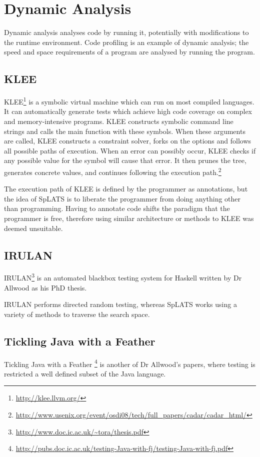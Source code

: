 \section{Dynamic Analysis} 

  Dynamic analysis analyses code by running it, potentially with modifications
  to the runtime environment. Code profiling is an example of dynamic analysis;
  the speed and space requirements of a program are analysed by running the
  program.
  
  \subsection{KLEE}
  KLEE\footnote{\url{http://klee.llvm.org/}} is a symbolic virtual machine which can run on most compiled languages. It can automatically generate tests which achieve high code coverage on complex and memory-intensive programs. KLEE constructs symbolic command line strings and calls the main function with these symbols. When these arguments are called, KLEE constructs a constraint solver, forks on the options and follows all possible paths of execution. When an error can possibly occur, KLEE checks if any possible value for the symbol will cause that error. It then prunes the tree, generates concrete values, and continues following the execution path.\footnote{\url{http://www.usenix.org/event/osdi08/tech/full_papers/cadar/cadar_html/}}

  The execution path of KLEE is defined by the programmer as annotations, but the idea of SpLATS is to liberate the programmer from doing anything other than programming. Having to annotate code shifts the paradigm that the programmer is free, therefore using similar architecture or methods to KLEE was deemed unsuitable.

  \subsection{IRULAN}
    IRULAN\footnote{\url{http://www.doc.ic.ac.uk/~tora/thesis.pdf}} is an 
    automated blackbox testing system for Haskell written by Dr Allwood 
    as his PhD thesis.

    IRULAN performs directed random testing, whereas SpLATS works using a variety 
    of methods to traverse the search space.

  \subsection{Tickling Java with a Feather}
    Tickling Java with a Feather
    \footnote{\url{http://pubs.doc.ic.ac.uk/testing-Java-with-fj/testing-Java-with-fj.pdf}}
    is another of Dr Allwood's papers, where testing is restricted a well defined
    subset of the Java language. 

